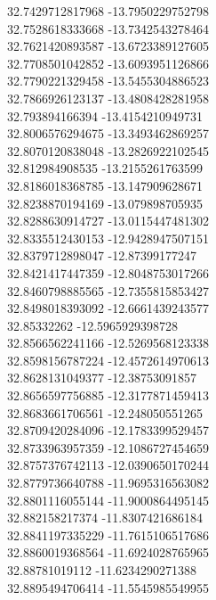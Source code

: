 {32.7429712817968	-13.7950229752798\\
32.7528618333668	-13.7342543278464\\
32.7621420893587	-13.6723389127605\\
32.7708501042852	-13.6093951126866\\
32.7790221329458	-13.5455304886523\\
32.7866926123137	-13.4808428281958\\
32.793894166394	-13.4154210949731\\
32.8006576294675	-13.3493462869257\\
32.8070120838048	-13.2826922102545\\
32.812984908535	-13.2155261763599\\
32.8186018368785	-13.147909628671\\
32.8238870194169	-13.079898705935\\
32.8288630914727	-13.0115447481302\\
32.8335512430153	-12.9428947507151\\
32.8379712898047	-12.87399177247\\
32.8421417447359	-12.8048753017266\\
32.8460798885565	-12.7355815853427\\
32.8498018393092	-12.6661439243577\\
32.85332262	-12.5965929398728\\
32.8566562241166	-12.5269568123338\\
32.8598156787224	-12.4572614970613\\
32.8628131049377	-12.38753091857\\
32.8656597756885	-12.3177871459413\\
32.8683661706561	-12.248050551265\\
32.8709420284096	-12.1783399529457\\
32.8733963957359	-12.1086727454659\\
32.8757376742113	-12.0390650170244\\
32.8779736640788	-11.9695316563082\\
32.8801116055144	-11.9000864495145\\
32.882158217374	-11.8307421686184\\
32.8841197335229	-11.7615106517686\\
32.8860019368564	-11.6924028765965\\
32.88781019112	-11.6234290271388\\
32.8895494706414	-11.5545985549955\\
}
